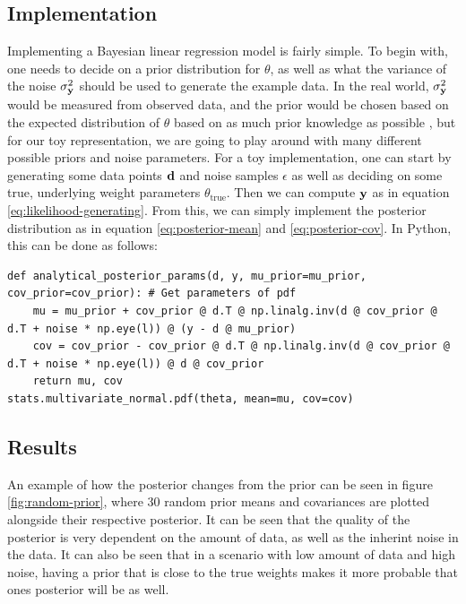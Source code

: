 \subsection{Implementation}
Implementing a Bayesian linear regression model is fairly simple.
To begin with, one needs to decide on a prior distribution for $\theta$, as well as what the variance of the noise $\sigma^2_{\mathbf{y}}$ should be used to generate the example data.
In the real world, $\sigma^2_{\mathbf{y}}$ would be measured from observed data, and the prior would be chosen based on the expected distribution of $\theta$ based on as much prior knowledge as possible
, but for our toy representation, we are going to play around with many different possible priors and noise parameters.
For a toy implementation, one can start by generating some data points $\mathbf{d}$ and noise samples $\epsilon$ as well as deciding on some true, underlying weight parameters $\theta_{\textrm{true}}$.
Then we can compute $\mathbf{y}$ as in equation \ref{eq:likelihood-generating}. 
From this, we can simply implement the posterior distribution as in equation \ref{eq:posterior-mean} and \ref{eq:posterior-cov}.
In Python, this can be done as follows:
\begin{verbatim}
def analytical_posterior_params(d, y, mu_prior=mu_prior, cov_prior=cov_prior): # Get parameters of pdf
    mu = mu_prior + cov_prior @ d.T @ np.linalg.inv(d @ cov_prior @ d.T + noise * np.eye(l)) @ (y - d @ mu_prior)
    cov = cov_prior - cov_prior @ d.T @ np.linalg.inv(d @ cov_prior @ d.T + noise * np.eye(l)) @ d @ cov_prior
    return mu, cov
stats.multivariate_normal.pdf(theta, mean=mu, cov=cov)
\end{verbatim}

\subsection{Results}
An example of how the posterior changes from the prior can be seen in figure \ref{fig:random-prior}, where 30 random prior means and covariances are plotted alongside their respective posterior.
It can be seen that the quality of the posterior is very dependent on the amount of data, as well as the inherint noise in the data.
It can also be seen that in a scenario with low amount of data and high noise, having a prior that is close to the true weights makes it more probable that ones posterior will be as well.

